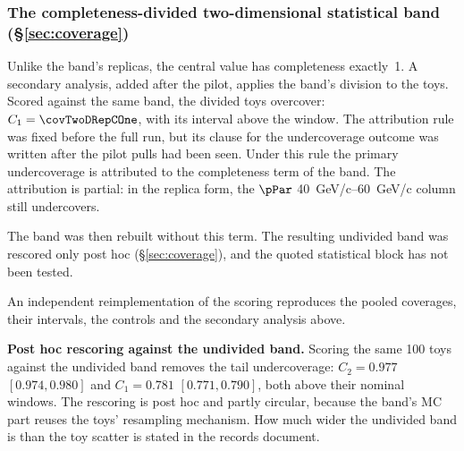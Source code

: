 \subsubsection{The completeness-divided two-dimensional statistical band (\S\ref{sec:coverage})}
\label{app:devhistory-band}

Unlike the band's replicas, the central value has completeness exactly~1. A secondary analysis, added after the pilot, applies the band's division to the toys. Scored against the same band, the divided toys overcover: $C_1=\covTwoDRepCOne$, with its interval above the window. The attribution rule was fixed before the full run, but its clause for the undercoverage outcome was written after the pilot pulls had been seen. Under this rule the primary undercoverage is attributed to the completeness term of the band. The attribution is partial: in the replica form, the $\pPar$ \SIrange{40}{60}{GeV/c} column still undercovers.

The band was then rebuilt without this term. The resulting undivided band was rescored only post hoc (\S\ref{sec:coverage}), and the quoted statistical block has not been tested.

An independent reimplementation of the scoring reproduces the pooled coverages, their intervals, the controls and the secondary analysis above.

\textbf{Post hoc rescoring against the undivided band.} Scoring the same 100 toys against the undivided band removes the tail undercoverage: $C_2=0.977$ $[0.974,0.980]$ and $C_1=0.781$ $[0.771,0.790]$, both above their nominal windows. The rescoring is post hoc and partly circular, because the band's MC part reuses the toys' resampling mechanism. How much wider the undivided band is than the toy scatter is stated in the records document.

